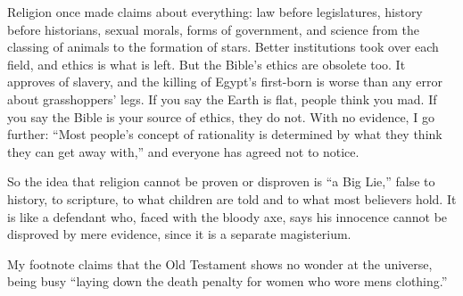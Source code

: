 Religion once made claims about everything: law before legislatures, history before historians, sexual morals, forms of government, and science from the classing of animals to the formation of stars. Better institutions took over each field, and ethics is what is left. But the Bible's ethics are obsolete too. It approves of slavery, and the killing of Egypt's first-born is worse than any error about grasshoppers' legs.  If you say the Earth is flat, people think you mad. If you say the Bible is your source of ethics, they do not. With no evidence, I go further: ``Most people's concept of rationality is determined by what they think they can get away with,'' and everyone has agreed not to notice.

So the idea that religion cannot be proven or disproven is ``a Big Lie,'' false to history, to scripture, to what children are told and to what most believers hold. It is like a defendant who, faced with the bloody axe, says his innocence cannot be disproved by mere evidence, since it is a separate magisterium. 

My footnote claims that the Old Testament shows no wonder at the universe, being busy ``laying down the death penalty for women who wore mens clothing.'' 
